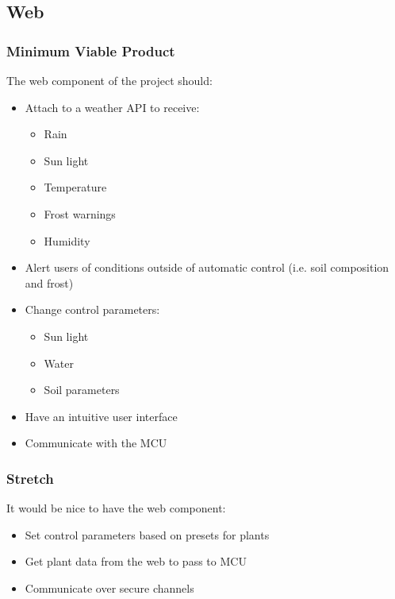 \subsection{Web}
\subsubsection{Minimum Viable Product}
The web component of the project should:
\begin{itemize}
    \item Attach to a weather API to receive:
    \begin{itemize}
        \item Rain
        \item Sun light
        \item Temperature
        \item Frost warnings
        \item Humidity
    \end{itemize}
    \item Alert users of conditions outside of automatic control (i.e. soil composition and frost)
    \item Change control parameters:
    \begin{itemize}
        \item Sun light
        \item Water
        \item Soil parameters
    \end{itemize}
    \item Have an intuitive user interface
    \item Communicate with the MCU
\end{itemize}
\subsubsection{Stretch}
It would be nice to have the web component:
\begin{itemize}
    \item Set control parameters based on presets for plants
    \item Get plant data from the web to pass to MCU
    \item Communicate over secure channels
\end{itemize}